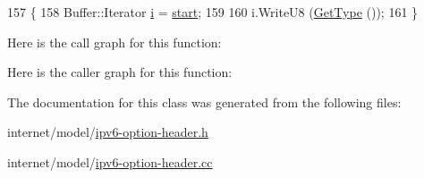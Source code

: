 \begin{DoxyCode}
157 \{
158   Buffer::Iterator \hyperlink{bernuolliDistribution_8m_a6f6ccfcf58b31cb6412107d9d5281426}{i} = \hyperlink{namespacevisualizer_1_1core_a2a35e5d8a34af358b508dac8635754e0}{start};
159 
160   i.WriteU8 (\hyperlink{classns3_1_1Ipv6OptionHeader_a1e588558d5a1bc90a1820dc68ff14c65}{GetType} ());
161 \}
\end{DoxyCode}


Here is the call graph for this function\+:




Here is the caller graph for this function\+:




The documentation for this class was generated from the following files\+:\begin{DoxyCompactItemize}
\item 
internet/model/\hyperlink{ipv6-option-header_8h}{ipv6-\/option-\/header.\+h}\item 
internet/model/\hyperlink{ipv6-option-header_8cc}{ipv6-\/option-\/header.\+cc}\end{DoxyCompactItemize}

